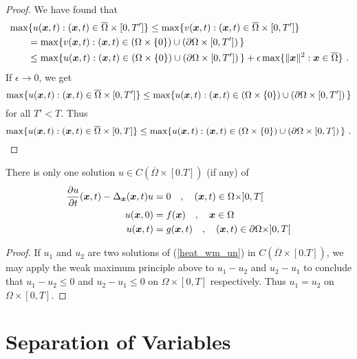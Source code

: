 \begin{proof}
We have found that
\begin{align*}
&\max \{ u({\bm{x}},t) : ({\bm{x}},t)\in \overline{\Omega}\times [0,T'] \}
\leq \max \{ v({\bm{x}},t) : ({\bm{x}},t)\in \overline{\Omega}\times
[0,T'] \} \\
&\qquad = \max \{ v({\bm{x}},t) : ({\bm{x}},t)\in (\Omega\times \{0\}) \cup
(\partial \Omega \times [0,T'])\,\} \\
&\qquad \leq \max \{ u({\bm{x}},t) : ({\bm{x}},t)\in (\Omega\times \{0\}) \cup
(\partial \Omega \times [0,T'])\,\} + \epsilon
\max \{ \|{\bm{x}}\|^2 : {\bm{x}}\in \overline{\Omega} \} \  .
\end{align*}
If $\epsilon \rightarrow 0$, we get
\[
\max \{ u({\bm{x}},t) : ({\bm{x}},t)\in \overline{\Omega}\times [0,T'] \}
\leq \max \{ u({\bm{x}},t) : ({\bm{x}},t)\in (\Omega\times \{0\}) \cup
(\partial \Omega \times [0,T'])\,\}
\]
for all $T'<T$.  Thus
\[
\max \{ u({\bm{x}},t) : ({\bm{x}},t)\in \overline{\Omega}\times [0,T] \}
\leq \max \{ u({\bm{x}},t) : ({\bm{x}},t)\in (\Omega\times \{0\}) \cup
(\partial \Omega \times [0,T])\,\} \ . \qedhere
\]
\end{proof}

\begin{cor}
There is only one solution
$u \in C(\overline{\Omega}\times [0.T])$ (if any) of
\begin{equation} \label{heat_wm_un}
\begin{split}
\frac{\partial{u}}{\partial t}({\bm{x}},t) - \Delta_{{\bm{x}}}({\bm{x}},t) u
&=0 \quad , \quad ({\bm{x}},t) \in \Omega \times ]0,T[ \\
u({\bm{x}},0) &= f({\bm{x}}) \quad , \quad {\bm{x}} \in \Omega \\
u({\bm{x}},t) &= g({\bm{x}},t) \quad , \quad ({\bm{x}},t) \in
\partial \Omega \times ]0,T[
\end{split}
\end{equation}
\end{cor}

\begin{proof}
If $u_1$ and $u_2$ are two solutions of (\ref{heat_wm_un}) in
$C(\overline{\Omega}\times [0.T])$, we may apply the weak maximum principle
above to $u_1-u_2$ and $u_2-u_1$ to conclude that
$u_1 - u_2 \leq 0$ and $u_2 - u_1 \leq 0$ on $\Omega \times [0,T]$
respectively.  Thus $u_1 =u_2$ on $\Omega \times [0,T]$.
\end{proof}

\section{Separation of Variables}

